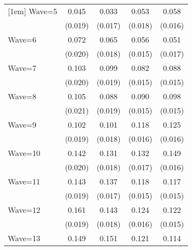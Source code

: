 {\begin{tabular}{l*{4}{c}}
[1em]
Wave=5              &       0.045\sym{*}  &       0.033         &       0.053\sym{**} &       0.058\sym{***}\\
                    &     (0.019)         &     (0.017)         &     (0.018)         &     (0.016)         \\
[1em]
Wave=6              &       0.072\sym{***}&       0.065\sym{***}&       0.056\sym{***}&       0.051\sym{**} \\
                    &     (0.020)         &     (0.018)         &     (0.015)         &     (0.017)         \\
[1em]
Wave=7              &       0.103\sym{***}&       0.099\sym{***}&       0.082\sym{***}&       0.088\sym{***}\\
                    &     (0.020)         &     (0.019)         &     (0.015)         &     (0.015)         \\
[1em]
Wave=8              &       0.105\sym{***}&       0.088\sym{***}&       0.090\sym{***}&       0.098\sym{***}\\
                    &     (0.021)         &     (0.019)         &     (0.015)         &     (0.015)         \\
[1em]
Wave=9              &       0.102\sym{***}&       0.101\sym{***}&       0.118\sym{***}&       0.125\sym{***}\\
                    &     (0.019)         &     (0.018)         &     (0.016)         &     (0.016)         \\
[1em]
Wave=10             &       0.142\sym{***}&       0.131\sym{***}&       0.132\sym{***}&       0.149\sym{***}\\
                    &     (0.020)         &     (0.018)         &     (0.017)         &     (0.016)         \\
[1em]
Wave=11             &       0.143\sym{***}&       0.137\sym{***}&       0.118\sym{***}&       0.117\sym{***}\\
                    &     (0.019)         &     (0.017)         &     (0.015)         &     (0.015)         \\
[1em]
Wave=12             &       0.161\sym{***}&       0.143\sym{***}&       0.124\sym{***}&       0.122\sym{***}\\
                    &     (0.019)         &     (0.018)         &     (0.016)         &     (0.015)         \\
[1em]
Wave=13             &       0.149\sym{***}&       0.151\sym{***}&       0.121\sym{***}&       0.114\sym{***}\\

\end{tabular}}
